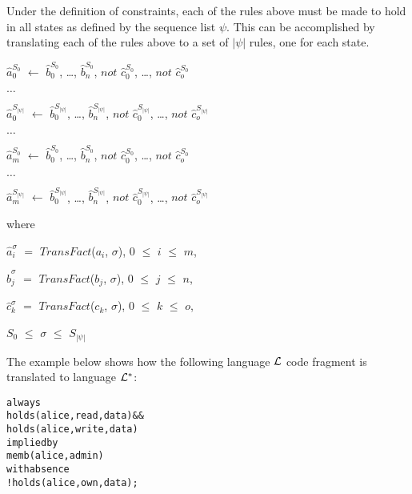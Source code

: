 \documentclass[11pt, twocolumn]{article}
\newenvironment{vquote}
  {\begin{list}{}{\leftmargin 1em}\item[]}
  {\end{list}}
\newenvironment{vverbatim}
  {\begin{alltt}}
  {\vspace{-\baselineskip}\end{alltt}}
\begin{document}
          Under the definition of constraints, each of the rules above must be
          made to hold in all states as defined by the sequence list $\psi$.
          This can be accomplished by translating each of the rules above to
          a set of $|\psi|$ rules, one for each state.

           \begin{vquote}
            $\hat{a}^{S_{0}}_{0}$ $\leftarrow$
            $\hat{b}^{S_{0}}_{0}$, \ldots, $\hat{b}^{S_{0}}_{n}$,
            $not$ $\hat{c}^{S_{0}}_{0}$, \ldots, $not$ $\hat{c}^{S_{0}}_{o}$

            $\ldots$

            $\hat{a}^{S_{|\psi|}}_{0}$ $\leftarrow$
            $\hat{b}^{S_{|\psi|}}_{0}$, \ldots, $\hat{b}^{S_{|\psi|}}_{n}$,
            $not$ $\hat{c}^{S_{|\psi|}}_{0}$, \ldots, $not$ $\hat{c}^{S_{|\psi|}}_{o}$

            $\ldots$

            $\hat{a}^{S_{0}}_{m}$ $\leftarrow$
            $\hat{b}^{S_{0}}_{0}$, \ldots, $\hat{b}^{S_{0}}_{n}$,
            $not$ $\hat{c}^{S_{0}}_{0}$, \ldots, $not$ $\hat{c}^{S_{0}}_{o}$

            $\ldots$

            $\hat{a}^{S_{|\psi|}}_{m}$ $\leftarrow$
            $\hat{b}^{S_{|\psi|}}_{0}$, \ldots, $\hat{b}^{S_{|\psi|}}_{n}$,
            $not$ $\hat{c}^{S_{|\psi|}}_{0}$, \ldots, $not$ $\hat{c}^{S_{|\psi|}}_{o}$

            where

            $\hat{a}^{\sigma}_{i}$ $=$ $TransFact$($a_{i}$, $\sigma$),
            $0$ $\leq$ $i$ $\leq$ $m$,

            $\hat{b}^{\sigma}_{j}$ $=$ $TransFact$($b_{j}$, $\sigma$),
            $0$ $\leq$ $j$ $\leq$ $n$,

            $\hat{c}^{\sigma}_{k}$ $=$ $TransFact$($c_{k}$, $\sigma$),
            $0$ $\leq$ $k$ $\leq$ $o$,

            $S_{0}$ $\leq$ $\sigma$ $\leq$ $S_{|\psi|}$
          \end{vquote}

          The example below shows how the following language ${\cal L}$ code
          fragment is translated to language ${\cal L}^{*}$:

          \begin{vverbatim}
  always
    holds(alice, read, data) &&
    holds(alice, write, data)
  implied by
    memb(alice, admin)
  with absence
    !holds(alice, own, data);
          \end{vverbatim}
\end{document}
